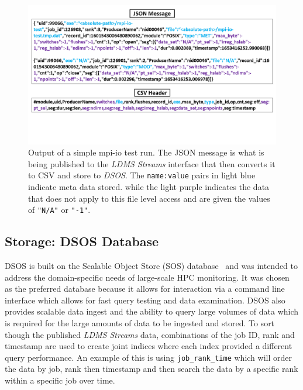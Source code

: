 \documentclass[conference]{IEEEtran}
\begin{document}
\begin{figure}
  \centering
    \includegraphics[trim={0 4cm 0 0},clip, width=1\linewidth]{figs/darshan-csv-json.png}
\caption{Output of a simple mpi-io test run. The JSON message is what is being published to the \emph{LDMS Streams} interface that then converts it to CSV and store to \emph{DSOS}. The \texttt{name:value} pairs in light blue indicate meta data stored. while the light purple indicates the data that does not apply to this file level access and are given the values of \texttt{"N/A"} or \texttt{"-1"}.}
\label{f:CSV Header and Output}
\end{figure}

\subsection{Storage: DSOS Database}
DSOS is built on the Scalable Object Store (SOS) database~\cite{sosgithub} and was intended to address the domain-specific needs of large-scale HPC monitoring. It was chosen as the preferred database because it allows for interaction via a command line interface which allows for fast query testing and data examination. DSOS also provides scalable data ingest and the ability to query large volumes of data which is required for the large amounts of data to be ingested and stored. %
To sort though the published \emph{LDMS Streams} data, combinations of the job ID, rank and timestamp are used to create joint indices where each index provided a different query performance. An example of this is using \texttt{job\_rank\_time} which will order the data by job, rank then timestamp and then search the data by a specific rank within a specific job over time.
\end{document}
